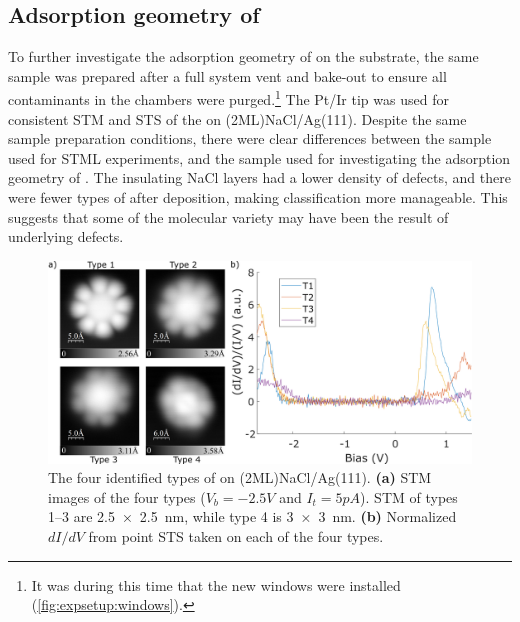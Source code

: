 \subsection{Adsorption geometry of }
\label{sec:opv:adsorp}

To further investigate the adsorption geometry of  on the substrate, the same sample was prepared after a full system vent and bake-out to ensure all contaminants in the chambers were purged.\footnote{It was during this time that the new windows were installed (\autoref{fig:expsetup:windows}).} The Pt/Ir tip was used for consistent \ac{STM} and \ac{STS} of the  on (2ML)NaCl/Ag(111). Despite the same sample preparation conditions, there were clear differences between the sample used for \ac{STML} experiments, and the sample used for investigating the adsorption geometry of . The insulating NaCl layers had a lower density of defects, and there were fewer types of  after deposition, making classification more manageable. This suggests that some of the molecular variety may have been the result of underlying defects. 




\begin{figure} [H]
    \centering
        \includegraphics[width=\textwidth]{pictures/4types_images.png}
    \caption{The four identified types of  on (2ML)NaCl/Ag(111). \textbf{(a)} STM images of the four types ($V_b = -2.5V$ and $I_t = 5pA$). STM of types 1--3 are \SI{2.5x2.5}{nm}, while type 4 is \SI{3x3}{nm}. \textbf{(b)} Normalized $dI/dV$ from point STS taken on each of the four types. }
    \label{fig:opv:f8znpc-sts_types}
\end{figure}

